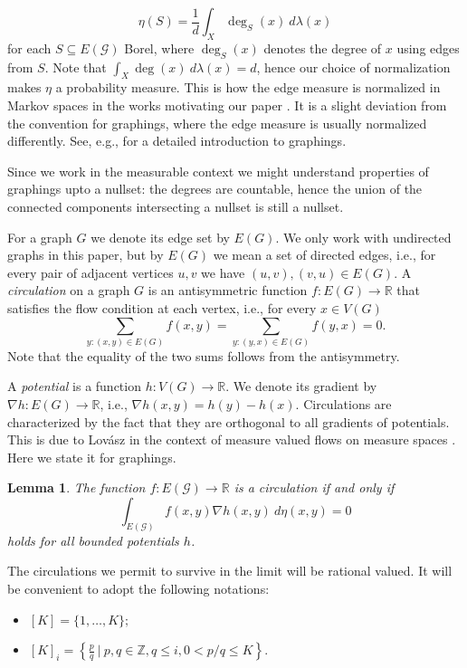 \documentclass[10pt]{article}
\theoremstyle{plain}
\newtheorem{lemma}{Lemma}[section]
\theoremstyle{remark}
\newcommand{\1}{\mathbbm{1}}
\newcommand{\Z}{\mathbb{Z}}
\numberwithin{equation}{section}
\begin{document}
$$\eta(S) = \frac{1}{d}\int_X \deg_S(x) \ d\lambda(x)$$ 
for each $S \subseteq E(\mathcal{G})$ Borel, where $\deg_S(x)$ denotes the degree of $x$ using edges from $S$.  Note that 
$\int_X \deg(x) \ d\lambda(x)=d$, hence our choice of normalization makes $\eta$ a probability measure. This is how the edge measure is normalized in Markov spaces in the works motivating our paper \cite{lovasz2021flows, kun2021measurable}. It is a slight deviation from the convention for graphings, where the edge measure is usually normalized differently. See, e.g., \cite{lovasz2012large} for a detailed introduction to graphings. 

Since we work in the measurable context we might understand properties of graphings upto a nullset: the degrees are countable, hence the union of the connected components intersecting a nullset is still a nullset.

For a graph $G$ we denote its edge set by $E(G)$. We only work with undirected graphs in this paper, but by $E(G)$ we mean a set of directed edges, i.e., for every pair of adjacent vertices $u, v$ we have $(u,v),(v,u) \in E(G)$.
A \emph{circulation} on a graph $G$ is an antisymmetric function $f: E(G) \to \mathbb{R}$ that satisfies the flow condition at each vertex, i.e., for every $x \in V(G)$ \[\sum_{y: (x,y) \in E(G)} f(x,y) = \sum_{y: (y,x) \in E(G)} f(y,x)=0.\]
Note that the equality of the two sums follows from the antisymmetry.

A \emph{potential} is a function $h: V(G) \to \mathbb{R}$. We denote its gradient by $\nabla h : E(G)\to \mathbb{R}$, i.e., $\nabla h(x,y) = h(y)-h(x)$. Circulations are characterized by the fact that they are orthogonal to all gradients of potentials. This is due to Lovász in the context of measure valued flows on measure spaces \cite{lovasz2021flows}. Here we state it for graphings.

\begin{lemma}\label{lem:potential_vs_circulation}
    The function $f:E(\mathcal{G}) \to \mathbb{R}$ is a circulation if and only if
    \[\int_{E(\mathcal{G})} f(x,y)\nabla h(x,y) \ d \eta(x,y) =0\]
     holds for all bounded potentials $h$.
\end{lemma}

The circulations we permit to survive in the limit will be rational valued. It will be convenient to adopt the following notations:


\begin{itemize}
    \item $[K]= \{1, \ldots , K\};$
    \item $[K]_i=\left\{\frac{p}{q} ~\Big|~ p,q \in \Z, q \leq i, 
    0 < p/q \leq K\right\}$.
\end{itemize}
\end{document}
